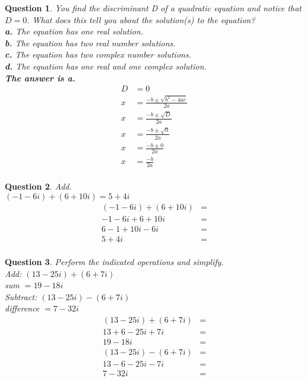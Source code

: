 \documentclass{amsart}
\newtheorem{question}{Question}
\begin{document}
	\begin{question}
		You find the discriminant D of a quadratic equation
		and notice that $D=0$. What does this tell you about
		the solution(s) to the equation?\\
		\textbf{a.} The equation has one real solution.\\
		\textbf{b.} The equation has two real number solutions.\\
		\textbf{c.} The equation has two complex number solutions.\\
		\textbf{d.} The equation has one real and one complex solution.\\
		\textbf{The answer is a.}\\
		\[\begin{aligned}
			D&=0\\
			x&=\frac{-b\pm\sqrt{b^2-4ac}}{2a}\\
			x&=\frac{-b\pm\sqrt{D}}{2a}\\
			x&=\frac{-b\pm\sqrt{0}}{2a}\\
			x&=\frac{-b\pm0}{2a}\\
			x&=\frac{-b}{2a}\\
		\end{aligned}\]
	\end{question}
	\begin{question}
		Add.\\
		$(-1-6i)+(6+10i)=\boxed{5+4i}$\\
		\[
		\begin{aligned}
			(-1-6i)+(6+10i)&=\\
			-1-6i+6+10i&=\\
			6-1+10i-6i&=\\
			5+4i&=\\
		\end{aligned}
		\]
	\end{question}
	\newpage
	\begin{question}
		Perform the indicated operations and simplify.\\
		Add: $(13-25i)+(6+7i)$\\
		sum $=\boxed{19-18i}$\\
		Subtract: $(13-25i)-(6+7i)$\\
		difference $=\boxed{7-32i}$
		\[\begin{aligned}
			(13-25i)+(6+7i)&=\\
			13+6-25i+7i&=\\
			19-18i&=\\
			(13-25i)-(6+7i)&=\\
			13-6-25i-7i&=\\
			7-32i&=\\
		\end{aligned}\]
	\end{question}
\end{document}
